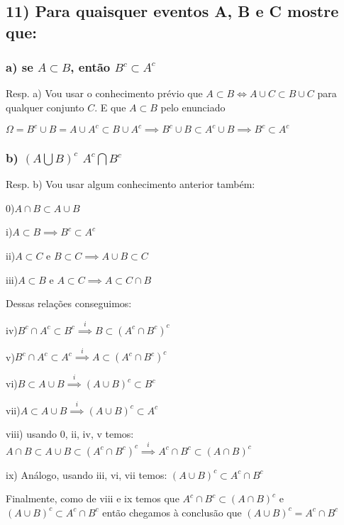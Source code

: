 \documentclass[portuguese]{article}
\begin{document}
\subsection*{\textmd{11) Para quaisquer eventos A, B e C mostre que:}}


\subsubsection*{\textmd{a) se $A\subset B$, então $B^{c}\subset A^{c}$}}

Resp. a) Vou usar o conhecimento prévio que $A\subset B\Longleftrightarrow A\cup C\subset B\cup C$
para qualquer conjunto $C.$ E que $A\subset B$ pelo enunciado

$\Omega=B^{c}\cup B=A\cup A^{c}\subset B\cup A^{c}\implies B^{c}\cup B\subset A^{c}\cup B\implies B^{c}\subset A^{c}$


\subsubsection*{\textmd{b) $(A\bigcup B)^{c}$ $A^{c}\bigcap B^{c}$ }}

Resp. b) Vou usar algum conhecimento anterior também:

0)$A\cap B\subset A\cup B$

i)$A\subset B\implies B^{c}\subset A^{c}$

ii)$A\subset C$ e $B\subset C\implies A\cup B\subset C$

iii)$A\subset B$ e $A\subset C\implies A\subset C\cap B$

Dessas relações conseguimos:

iv)$B^{c}\cap A^{c}\subset B^{c}\overset{i}{\implies}B\subset(A^{c}\cap B^{c})^{c}$

v)$B^{c}\cap A^{c}\subset A^{c}\overset{i}{\implies}A\subset(A^{c}\cap B^{c})^{c}$

vi)$B\subset A\cup B\overset{i}{\implies}(A\cup B)^{c}\subset B^{c}$

vii)$A\subset A\cup B\overset{i}{\implies}(A\cup B)^{c}\subset A^{c}$

viii) usando 0, ii, iv, v temos: $A\cap B\subset A\cup B\subset(A^{c}\cap B^{c})^{c}\overset{i}{\implies}A^{c}\cap B^{c}\subset(A\cap B)^{c}$

ix) Análogo, usando iii, vi, vii temos: $(A\cup B)^{c}\subset A^{c}\cap B^{c}$

Finalmente, como de viii e ix temos que $A^{c}\cap B^{c}\subset(A\cap B)^{c}$
e $(A\cup B)^{c}\subset A^{c}\cap B^{c}$ então chegamos à conclusão
que $(A\cup B)^{c}=A^{c}\cap B^{c}$
\end{document}
